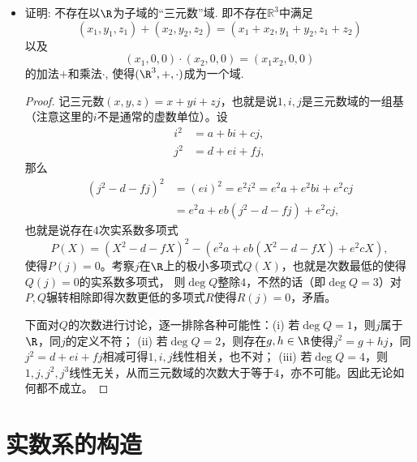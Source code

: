 \begin{3b}
\begin{itemize}
\item[5.] 证明: 不存在以\(\R\)为子域的``三元数''域. 即不存在\(\mathbb{R}^3\)中满足
\[(x_1,y_1,z_1)+(x_2,y_2,z_2)=(x_1+x_2,y_1+y_2,z_1+z_2)\]
以及\[(x_1,0,0)\cdot (x_2,0,0)=(x_1x_2,0,0)\]
的加法\(+\)和乘法\(\cdot\), 使得\((\R^3,+,\cdot)\)成为一个域.
\begin{proof}
    记三元数$(x,y,z)=x+yi+zj$，也就是说$1,i,j$是三元数域的一组基
    （注意这里的$i$不是通常的虚数单位）。设
    \begin{align*}i^2&=a+bi+cj,\\j^2&=d+ei+fj,\end{align*}
    那么
    \begin{align*}(j^2-d-fj)^2&=(ei)^2=e^2i^2=e^2a+e^2bi+e^2cj\\
    &=e^2a+eb(j^2-d-fj)+e^2cj,\end{align*}
    也就是说存在$4$次实系数多项式\[P(X)=(X^2-d-fX)^2-(e^2a+eb(X^2-d-fX)+e^2cX),\]
    使得$P(j)=0$。考察$j$在$\R$上的极小多项式$Q(X)$，也就是次数最低的使得$Q(j)=0$的实系数多项式，
    则$\deg Q$整除$4$，不然的话（即$\deg Q=3$）对$P,Q$辗转相除即得次数更低的多项式$R$使得$R(j)=0$，矛盾。

    下面对$Q$的次数进行讨论，逐一排除各种可能性：(i) 若$\deg Q=1$，则$j$属于$\R$，同$j$的定义不符；
    (ii) 若$\deg Q=2$，则存在$g,h\in\R$使得$j^2=g+hj$，同$j^2=d+ei+fj$相减可得$1,i,j$线性相关，也不对；
    (iii) 若$\deg Q=4$，则$1,j,j^2,j^3$线性无关，从而三元数域的次数大于等于$4$，亦不可能。因此无论如何都不成立。
\end{proof}
\end{itemize}
\end{3b}
\section{实数系的构造}
